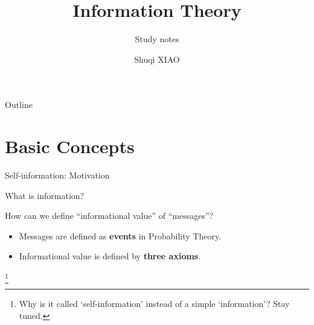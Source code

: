 \documentclass[10pt,aspectratio=1610]{beamer}
\title{Information Theory}
\subtitle{Study notes}
\author{Shuqi XIAO}
\newcommand\blfootnote[1]{%
  \begingroup
  \renewcommand\thefootnote{}\footnote{#1}%
  \addtocounter{footnote}{-1}%
  \endgroup
}
\begin{document}
\maketitle
\begin{frame}{Outline}
	\tableofcontents
\end{frame}

\section{Basic Concepts}
\begin{frame}{Self-information: Motivation}
	\vspace*{\fill}
	\par What is information?
	\vspace*{\fill}
	\par How can we define ``informational value'' of ``messages''?
	\vspace*{1.5ex}
	\begin{itemize}
		\setlength{\itemsep}{1.5ex}
		\item Messages are defined as \textbf{events} in Probability Theory.
		\item Informational value is defined by \textbf{three axioms}.
	\end{itemize}
	\blfootnote{Why is it called `self-information' instead of a simple `information'? Stay tuned.}
	\vspace*{\fill}
\end{frame}
\end{document}
